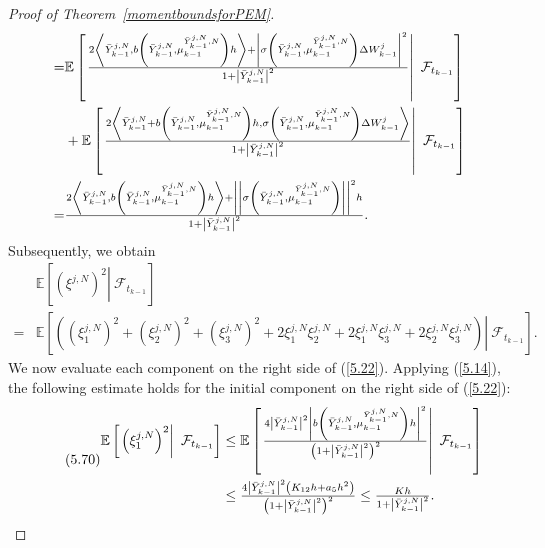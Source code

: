 \documentclass[12pt]{article}
\numberwithin{equation}{section}
\begin{document}
\begin{proof}[Proof of Theorem~\ref{momentboundsforPEM}]
\begin{equation}
\begin{aligned}
=&\mathbb{E}\left[\left.\tfrac{2\left\langle \Bar{Y}^{j,N}_{k-1}, b\left(\bar{Y}^{j,N}_{k-1},\mu^{\bar{Y}^{j,N}_{k-1},N}_{k-1}\right)h\right\rangle+\left|\sigma\left(\bar{Y}^{j,N}_{k-1},\mu^{\bar{Y}^{j,N}_{k-1},N}_{k-1}\right) \Delta W_{k-1}^{j}\right|^2}{1+\left|\bar{Y}^{j,N}_{k-1}\right|^2} \right\rvert\ \mathcal{F}_{t_{k-1}}\right] \\
&+\mathbb{E}\left[\left.\tfrac{2\left\langle\bar{Y}^{j,N}_{k-1}+b\left(\bar{Y}^{j,N}_{k-1},\mu^{\bar{Y}^{j,N}_{k-1},N}_{k-1}\right)h, \sigma\left(\bar{Y}^{j,N}_{k-1},\mu^{\bar{Y}^{j,N}_{k-1},N}_{k-1}\right) \Delta W_{k-1}^{j}\right\rangle}{1+\left|\Bar{Y}^{j,N}_{k-1}\right|^2} \right\rvert\ \mathcal{F}_{t_{k-1}}\right]\\
=&\tfrac{2\left\langle\bar{Y}^{j,N}_{k-1}, b\left(\bar{Y}^{j,N}_{k-1},\mu^{\bar{Y}^{j,N}_{k-1},N}_{k-1}\right)h\right\rangle+\left|\left|\sigma\left(\bar{Y}^{j,N}_{k-1},\mu^{\bar{Y}^{j,N}_{k-1},N}_{k-1}\right)\right|\right|^2 h}{1+\left|\Bar{Y}^{j,N}_{k-1}\right|^2}.\\
\end{aligned}
\end{equation}
Subsequently, we obtain
\begin{equation}\tag{5.69}\label{5.22}
\begin{aligned}
 &\mathbb{E}\left[\left.\left(\xi^{j,N}\right)^2  \right\rvert\ \mathcal{F}_{t_{k-1}}\right] \\
=  &\mathbb{E}\left[\left.\left(\left(\xi^{j,N}_1\right)^2+\left(\xi^{j,N}_2\right)^2+\left(\xi^{j,N}_3\right)^2+2 \xi^{j,N}_1 \xi^{j,N}_2+2 \xi^{j,N}_1 \xi^{j,N}_3+2 \xi^{j,N}_2 \xi^{j,N}_3\right)  \right\rvert\ \mathcal{F}_{t_{k-1}}\right].
\end{aligned}
\end{equation}
We now evaluate each component on the right side of (\ref{5.22}). Applying (\ref{5.14}), the following estimate holds for the initial component on the right side of (\ref{5.22}):
\begin{equation}\tag{5.70}\label{5.23}
\begin{aligned}
\mathbb{E}\left[\left.\left(\xi^{j,N}_1\right)^2  \right\rvert\ \mathcal{F}_{t_{k-1}}\right] & \leq \mathbb{E}\left[\left.\tfrac{4\left|\bar{Y}^{j,N}_{k-1}\right|^2\left|b\left(\bar{Y}^{j,N}_{k-1},\mu^{\bar{Y}^{j,N}_{k-1},N}_{k-1}\right)h\right|^2}{\left(1+\left|\bar{Y}^{j,N}_{k-1}\right|^2\right)^2}  \right\rvert\ \mathcal{F}_{t_{k-1}}\right] \\
& \leq \tfrac{4\left|\bar{Y}^{j,N}_{k-1}\right|^2\left(K_{12} h+a_5 h^2\right)}{\left(1+\left|\bar{Y}^{j,N}_{k-1}\right|^2\right)^2}    \leq \tfrac{K h}{1+\left|\Bar{Y}^{j,N}_{k-1}\right|^2}.

\end{aligned}
\end{equation}
\end{proof}
\end{document}
